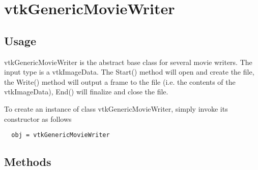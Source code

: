 \section{vtkGenericMovieWriter}

\subsection{Usage}

 vtkGenericMovieWriter is the abstract base class for several movie
 writers. The input type is a vtkImageData. The Start() method will
 open and create the file, the Write() method will output a frame to
 the file (i.e. the contents of the vtkImageData), End() will finalize
 and close the file.

To create an instance of class vtkGenericMovieWriter, simply
invoke its constructor as follows
\begin{verbatim}
  obj = vtkGenericMovieWriter
\end{verbatim}
\subsection{Methods}

